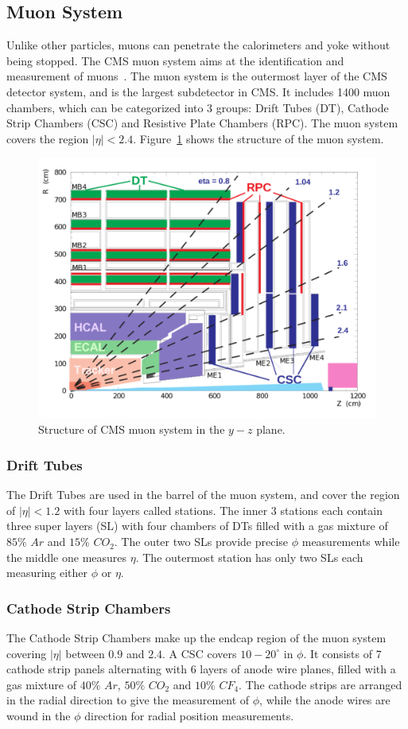 \subsection{Muon System} 
Unlike other particles, muons can penetrate the calorimeters and yoke without being stopped. The CMS muon system aims at the identification and measurement of muons~\cite{lhc_muondesign}. The muon system is the outermost layer of the CMS detector system, and is the largest subdetector in CMS. It includes 1400 muon chambers, which can be categorized into 3 groups: Drift Tubes (DT), Cathode Strip Chambers (CSC) and Resistive Plate Chambers (RPC). The muon system covers the region $|\eta|<2.4$. Figure~\ref{fig:lhc_muon} shows the structure of the muon system.
\begin{figure}[htbp]
\begin{center}
\includegraphics[width=0.7\linewidth]{figures/lhc_muon.pdf}
\caption{Structure of CMS muon system in the $y-z$ plane.}
\label{fig:lhc_muon}
\end{center}
\end{figure}

\subsubsection{Drift Tubes}
The Drift Tubes are used in the barrel of the muon system, and cover the region of $|\eta|<1.2$ with four layers called stations. The inner 3 stations each contain three super layers (SL) with four chambers of DTs filled with a gas mixture of $85\%$ $Ar$ and $15\%$ $CO_{2}$. The outer two SLs provide precise $\phi$ measurements while the middle one measures $\eta$. The outermost station has only two SLs each measuring either $\phi$ or $\eta$.

\subsubsection{Cathode Strip Chambers}
The Cathode Strip Chambers make up the endcap region of the muon system covering $|\eta|$ between $0.9$ and $2.4$. A CSC covers $10-20^{\circ}$ in $\phi$. It consists of 7 cathode strip panels alternating with 6 layers of anode wire planes, filled with a gas mixture of $40\%$ $Ar$, $50\%$ $CO_{2}$ and $10\%$ $CF_{4}$. The cathode strips are arranged in the radial direction to give the measurement of $\phi$, while the anode wires are wound in the $\phi$ direction for radial position measurements.

